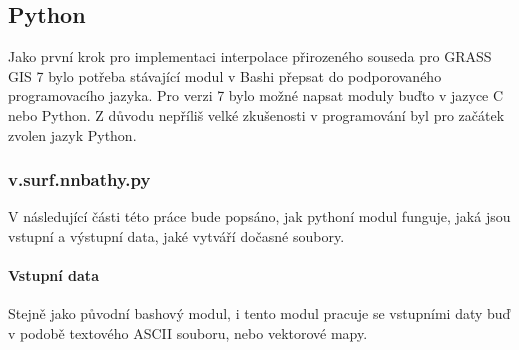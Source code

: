 \documentclass[12pt,a4paper]{article}
\begin{document}

\newpage
\subsection{Python}
Jako první krok pro implementaci interpolace přirozeného souseda pro GRASS GIS 7 bylo potřeba stávající modul v Bashi přepsat do podporovaného programovacího jazyka. Pro verzi 7 bylo možné napsat moduly buďto v jazyce C nebo Python. Z důvodu nepříliš velké zkušenosti v programování byl pro začátek zvolen jazyk Python.

\subsubsection{v.surf.nnbathy.py}

V následující části této práce bude popsáno, jak pythoní modul funguje, jaká jsou vstupní a výstupní data, jaké vytváří dočasné soubory.

\paragraph{Vstupní data}
Stejně jako původní bashový modul, i tento modul pracuje se vstupními daty buď v podobě textového ASCII souboru, nebo vektorové mapy. 
\end{document}
